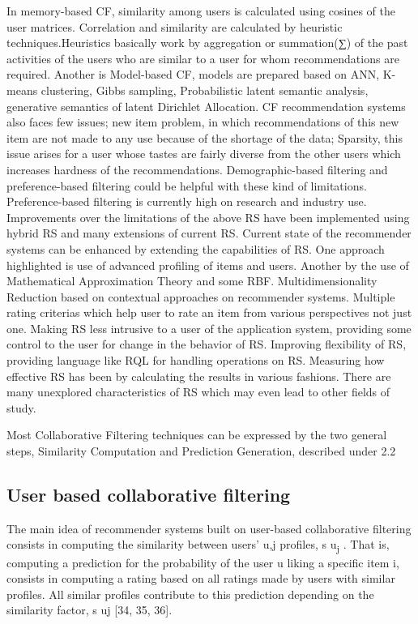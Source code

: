 In memory-based CF, similarity among users is calculated using cosines of the user matrices. Correlation and similarity are calculated by heuristic techniques.Heuristics basically work by aggregation or summation(∑) of the past activities of the users who are similar to a user for whom recommendations are required. Another is Model-based CF, models are prepared based on ANN, K-means clustering, Gibbs sampling, Probabilistic latent semantic analysis, generative semantics of latent Dirichlet Allocation. CF recommendation systems also faces few issues; new item problem, in which recommendations of this new item are not made to any use because of the shortage of the data; Sparsity, this issue arises for a user whose tastes are fairly diverse from the other users which increases hardness of the recommendations. Demographic-based filtering and preference-based filtering could be helpful with these kind of limitations. Preference-based filtering is currently high on research and industry use. Improvements over the limitations of the above RS have been implemented using hybrid RS and many extensions of current RS. Current state of the recommender systems can be enhanced by extending the capabilities of RS. One approach highlighted is use of advanced profiling of items and users. Another by the use of Mathematical Approximation Theory and some RBF. Multidimensionality Reduction based on contextual approaches on recommender systems. Multiple rating criterias which help user to rate an item from various perspectives not just one. Making RS less intrusive to a user of the application system, providing some control to the user for change in the behavior of RS. Improving flexibility of RS, providing language like RQL for handling operations on RS. Measuring how effective RS has been by calculating the results in various fashions. There are many unexplored characteristics of RS which may even lead to other fields of study.

Most Collaborative Filtering techniques can be expressed by the two general steps, Similarity Computation and Prediction Generation, described under 2.2

\subsection{User based collaborative filtering}
The main idea of recommender systems built on user-based collaborative filtering consists in computing the similarity between users’ {u,j} profiles, s u\textsubscript{j} . That is, computing a prediction for the probability of the user u liking a specific item i, consists in computing a rating based on all ratings made by users with similar profiles. All similar profiles contribute to this prediction depending on the similarity factor, s uj [34, 35, 36]. 

